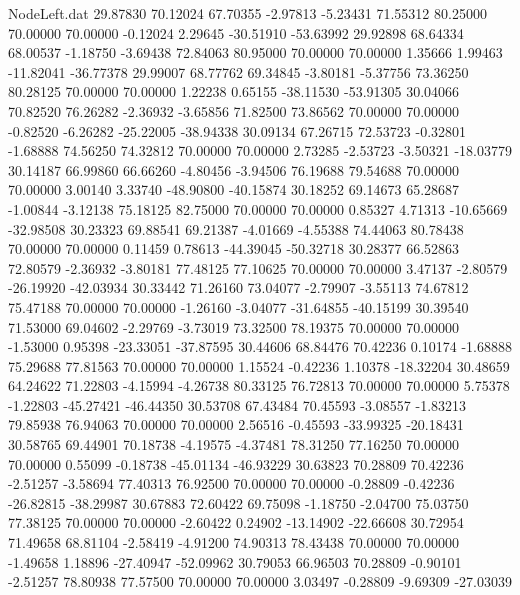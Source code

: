 \begin{filecontents}{NodeLeft.dat}
  29.87830   70.12024   67.70355    -2.97813   -5.23431   71.55312   80.25000   70.00000   70.00000   -0.12024    2.29645  -30.51910  -53.63992
  29.92898   68.64334   68.00537    -1.18750   -3.69438   72.84063   80.95000   70.00000   70.00000    1.35666    1.99463  -11.82041  -36.77378
  29.99007   68.77762   69.34845    -3.80181   -5.37756   73.36250   80.28125   70.00000   70.00000    1.22238    0.65155  -38.11530  -53.91305
  30.04066   70.82520   76.26282    -2.36932   -3.65856   71.82500   73.86562   70.00000   70.00000   -0.82520   -6.26282  -25.22005  -38.94338
  30.09134   67.26715   72.53723    -0.32801   -1.68888   74.56250   74.32812   70.00000   70.00000    2.73285   -2.53723   -3.50321  -18.03779
  30.14187   66.99860   66.66260    -4.80456   -3.94506   76.19688   79.54688   70.00000   70.00000    3.00140    3.33740  -48.90800  -40.15874
  30.18252   69.14673   65.28687    -1.00844   -3.12138   75.18125   82.75000   70.00000   70.00000    0.85327    4.71313  -10.65669  -32.98508
  30.23323   69.88541   69.21387    -4.01669   -4.55388   74.44063   80.78438   70.00000   70.00000    0.11459    0.78613  -44.39045  -50.32718
  30.28377   66.52863   72.80579    -2.36932   -3.80181   77.48125   77.10625   70.00000   70.00000    3.47137   -2.80579  -26.19920  -42.03934
  30.33442   71.26160   73.04077    -2.79907   -3.55113   74.67812   75.47188   70.00000   70.00000   -1.26160   -3.04077  -31.64855  -40.15199
  30.39540   71.53000   69.04602    -2.29769   -3.73019   73.32500   78.19375   70.00000   70.00000   -1.53000    0.95398  -23.33051  -37.87595
  30.44606   68.84476   70.42236     0.10174   -1.68888   75.29688   77.81563   70.00000   70.00000    1.15524   -0.42236    1.10378  -18.32204
  30.48659   64.24622   71.22803    -4.15994   -4.26738   80.33125   76.72813   70.00000   70.00000    5.75378   -1.22803  -45.27421  -46.44350
  30.53708   67.43484   70.45593    -3.08557   -1.83213   79.85938   76.94063   70.00000   70.00000    2.56516   -0.45593  -33.99325  -20.18431
  30.58765   69.44901   70.18738    -4.19575   -4.37481   78.31250   77.16250   70.00000   70.00000    0.55099   -0.18738  -45.01134  -46.93229
  30.63823   70.28809   70.42236    -2.51257   -3.58694   77.40313   76.92500   70.00000   70.00000   -0.28809   -0.42236  -26.82815  -38.29987
  30.67883   72.60422   69.75098    -1.18750   -2.04700   75.03750   77.38125   70.00000   70.00000   -2.60422    0.24902  -13.14902  -22.66608
  30.72954   71.49658   68.81104    -2.58419   -4.91200   74.90313   78.43438   70.00000   70.00000   -1.49658    1.18896  -27.40947  -52.09962
  30.79053   66.96503   70.28809    -0.90101   -2.51257   78.80938   77.57500   70.00000   70.00000    3.03497   -0.28809   -9.69309  -27.03039

\end{filecontents}
